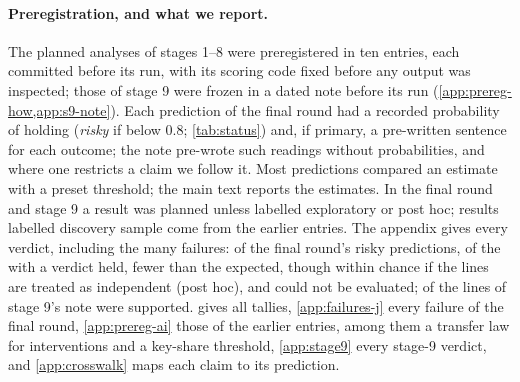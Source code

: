 \paragraph{Preregistration, and what we report.}
The planned analyses of stages 1--8 were preregistered in ten entries, each committed before its run, with its scoring code fixed before any output was inspected; those of stage 9 were frozen in a dated note before its run (\cref{app:prereg-how,app:s9-note}). Each prediction of the final round had a recorded probability of holding (\emph{risky} if below 0.8; \cref{tab:status}) and, if primary, a pre-written sentence for each outcome; the note pre-wrote such readings without probabilities, and where one restricts a claim we follow it. Most predictions compared an estimate with a preset threshold; the main text reports the estimates. In the final round and stage 9 a result was planned unless labelled exploratory or post hoc; results labelled discovery sample come from the earlier entries. The appendix gives every verdict, including the many failures: of the final round's risky predictions, \JxRiskyMetABCD{} of the \JxRiskyVerdABCD{} with a verdict held, fewer than the \JxRiskyExpABCD{} expected, though within chance if the lines are treated as independent (post hoc), and \JxRiskyNotEvalABCD{} could not be evaluated; \NqTotSupported{} of the \NqTotLines{} lines of stage 9's note were supported.  gives all tallies, \cref{app:failures-j} every failure of the final round, \cref{app:prereg-ai} those of the earlier entries, among them a transfer law for interventions and a key-share threshold, \cref{app:stage9} every stage-9 verdict, and \cref{app:crosswalk} maps each claim to its prediction.
